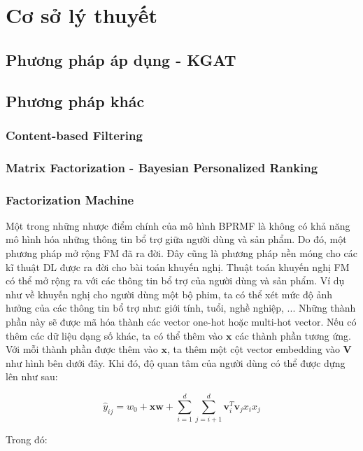 \section{Cơ sở lý thuyết}
\subsection{Phương pháp áp dụng - KGAT}
\subsection{Phương pháp khác}
\subsubsection{Content-based Filtering}
\subsubsection{Matrix Factorization - Bayesian Personalized Ranking}
\subsubsection{Factorization Machine}
Một trong những nhược điểm chính của mô hình BPRMF là không có khả năng mô hình hóa 
những thông tin bổ trợ giữa người dùng và sản phẩm. Do đó, một phương pháp mở rộng FM đã ra đời. 
Đây cũng là phương pháp nền móng cho các kĩ thuật DL được ra đời cho bài toán khuyến nghị.
\newline
\indent Thuật toán khuyến nghị FM có thể mở rộng ra với các thông tin bổ trợ của người dùng và sản phẩm. 
Ví dụ như về khuyến nghị cho người dùng một bộ phim, ta có thể xét mức độ ảnh hưởng của 
các thông tin bổ trợ như: giới tính, tuổi, nghề nghiệp, ... Những thành phần này sẽ được mã hóa 
thành các vector one-hot hoặc multi-hot vector. Nếu có thêm các dữ liệu dạng số khác, 
ta có thể thêm vào $\mathbf{x}$ các thành phần tương ứng. Với mỗi thành phần được thêm vào 
$\mathbf{x}$, ta thêm một cột vector embedding vào $\mathbf{V}$ như hình bên dưới đây.
Khi đó, độ quan tâm của người dùng có thể được dựng lên như sau:

$$\hat{y}_{ij} = w_0 + \mathbf{xw} + \sum_{i=1}^{d}\sum_{j=i+1}^{d} \mathbf{v}_i^T\mathbf{v}_jx_ix_j$$

Trong đó:

